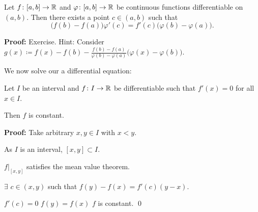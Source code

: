 \documentclass[10pt,aspectratio=149]{beamer}
\begin{document}
\begin{frame}
\begin{theorem}
Let $f \colon [a,b] \to {\mathbb{R}}$ and $\varphi \colon [a,b] \to {\mathbb{R}}$ be continuous
functions
differentiable on $(a,b)$.  Then there exists a point $c \in (a,b)$
such that
\begin{equation*}
\bigl(f(b)-f(a)\bigr)\varphi'(c) = f'(c)\bigl(\varphi(b)-\varphi(a)\bigr) .
\end{equation*}
\end{theorem}

\pause
\textbf{Proof:} Exercise.
\pause
Hint: Consider
$g(x) \coloneqq
f(x)-f(b)-\frac{f(b)-f(a)}{\varphi(b)-\varphi(a)}\bigl(\varphi(x)-\varphi(b)\bigr)$.

\end{frame}

\begin{frame}

We now solve our a differential equation:

\begin{proposition}
Let $I$ be an interval and
$f \colon I \to {\mathbb{R}}$ be differentiable such that $f'(x) = 0$
for all $x \in I$.

\pause
Then $f$ is constant.
\end{proposition}

\pause
\textbf{Proof:}
Take arbitrary $x,y \in I$ with $x < y$.

\pause
\medskip

As $I$ is an interval, $[x,y] \subset I$.

\pause
\medskip

$f|_{[x,y]}$ satisfies the mean value theorem.

\pause
\medskip

\thus \quad $\exists$ $c \in (x,y)$ such that
$\displaystyle f(y)-f(x) = f'(c)(y-x)$.

\pause
\medskip

$f'(c) = 0$
\pause
\wthus $f(y) = f(x)$
\pause
\wthus $f$ is constant.
\qed
\end{frame}
\end{document}

